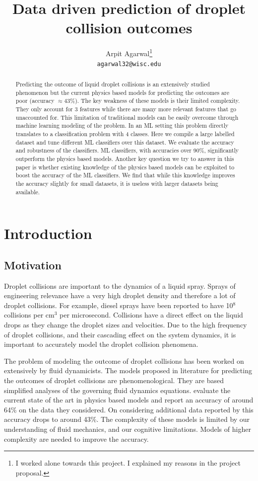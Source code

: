 \documentclass{article}
\title{Data driven prediction of droplet collision outcomes}
\author{
  Arpit Agarwal\thanks{I worked alone towards this project. I explained my reasons in the project proposal.} \\
  \texttt{agarwal32@wisc.edu} \\
}
\begin{document}

\maketitle

\begin{abstract}
Predicting the outcome of liquid droplet collisions is an extensively studied phenomenon but the current physics based models for predicting the outcomes are poor (accuracy $\approx 43\%$). The key weakness of these models is their limited complexity. They only account for 3 features while there are many more relevant features that go unaccounted for. This limitation of traditional models can be easily overcome through machine learning modeling of the problem. In an ML setting this problem directly translates to a classification problem with 4 classes. Here we compile a large labelled dataset and tune different ML classifiers over this dataset. We evaluate the accuracy and robustness of the classifiers. ML classifiers, with accuracies over 90\%, significantly outperform the physics based models. Another key question we try to answer in this paper is whether existing knowledge of the physics based models can be exploited to boost the accuracy of the ML classifiers. We find that while this knowledge improves the accuracy slightly for small datasets, it is useless with larger datasets being available.
\end{abstract}

\section{Introduction}
\subsection{Motivation}
Droplet collisions are important to the dynamics of a liquid spray. Sprays of engineering relevance have a very high droplet density and therefore a lot of droplet collisions. For example, diesel sprays have been reported to have 10$^8$  collisions per cm$^3$ per microsecond. Collisions have a direct effect on the liquid drops as they change the droplet sizes and velocities. Due to the high frequency of droplet collisions, and their cascading effect on the system dynamics, it is important to accurately model the droplet collision phenomena.

The problem of modeling the outcome of droplet collisions has been worked on extensively by fluid dynamicists. The models proposed in literature for predicting the outcomes of droplet collisions are phenomenological. They are based simplified analyses of the governing fluid dynamics equations. \citet{evaluating_collision} evaluate the current state of the art in physics based models and report an accuracy of around 64\% on the data they considered. On considering additional data reported by \citet{sommerfeld2016modelling} this accuracy drops to around 43\%. The complexity of these models is limited by our understanding of fluid mechanics, and our cognitive limitations. Models of higher complexity are needed to improve the accuracy.
\end{document}
